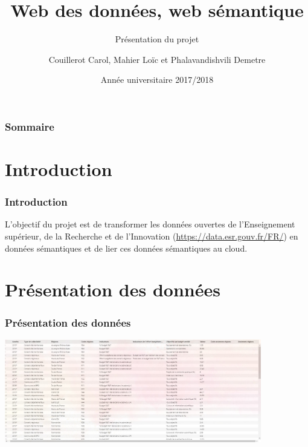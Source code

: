 \documentclass[12pt]{beamer}
\title{Web des données, web sémantique}
\subtitle{Présentation du projet}
\author{Couillerot Carol, Mahier Loïc et Phalavandishvili Demetre}\institute{Faculté des Sciences et Techniques de Nantes}
\date{Année universitaire 2017/2018}
\begin{document}
	\begin{frame}
	
		\maketitle
		
	\end{frame}

	
	\begin{frame}
	
		\frametitle{Sommaire}
   	
   		\tableofcontents[currentsubsection,sectionstyle=show/shaded,subsectionstyle=show/shaded/hide]
	
	\end{frame} 

	
	\section{Introduction}
	
		\begin{frame}
		
			\frametitle{Introduction}
		
			L’objectif du projet est de transformer les données ouvertes de l'Enseignement supérieur, de la Recherche et de l'Innovation (\url{https://data.esr.gouv.fr/FR/}) en données sémantiques et de lier ces données sémantiques au cloud.
				
		\end{frame}


	\section{Présentation des données}
	
		\begin{frame}
		
			\frametitle{Présentation des données}
		
			\centering\includegraphics[height=4.5cm]{picture/data.jpg}
				
		\end{frame}
		
\end{document}

